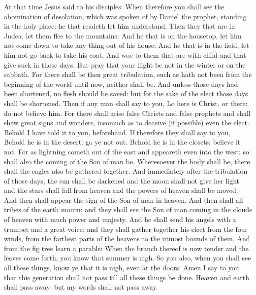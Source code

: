 \begin{multicols}{2}
At that time Jesus said to his disciples:
When therefore you shall see the abomination of desolation, which
was spoken of by Daniel the prophet, standing in the holy place: he that
readeth let him understand.
Then they that are in Judea, let them flee to the mountains:
And he that is on the housetop, let him not come down to take any
thing out of his house:
And he that is in the field, let him not go back to take his
coat.
And woe to them that are with child and that give suck in those
days.
But pray that your flight be not in the winter or on the sabbath.
For there shall be then great tribulation, such as hath not been
from the beginning of the world until now, neither shall be.
And unless those days had been shortened, no flesh should be
saved: but for the sake of the elect those days shall be shortened.
Then if any man shall say to you, Lo here is Christ, or there: do
not believe him.
For there shall arise false Christs and false prophets and shall
shew great signs and wonders, insomuch as to deceive (if possible) even
the elect.
Behold I have told it to you, beforehand.
If therefore they shall say to you, Behold he is in the desert:
go ye not out. Behold he is in the closets: believe it not.
For as lightning cometh out of the east and appeareth even into
the west: so shall also the coming of the Son of man be.
Wheresoever the body shall be, there shall the eagles also be
gathered together.
And immediately after the tribulation of those days, the sun
shall be darkened and the moon shall not give her light and the stars
shall fall from heaven and the powers of heaven shall be moved.
And then shall appear the sign of the Son of man in heaven.  And
then shall all tribes of the earth mourn: and they shall see the Son of
man coming in the clouds of heaven with much power and majesty.
And he shall send his angels with a trumpet and a great voice:
and they shall gather together his elect from the four winds, from the
farthest parts of the heavens to the utmost bounds of them.
And from the fig tree learn a parable: When the branch thereof is
now tender and the leaves come forth, you know that summer is nigh.
So you also, when you shall see all these things, know ye that it
is nigh, even at the doors.
Amen I say to you that this generation shall not pass till all
these things be done.
Heaven and earth shall pass away: but my words shall not pass away.



\end{multicols}

\normalsize




